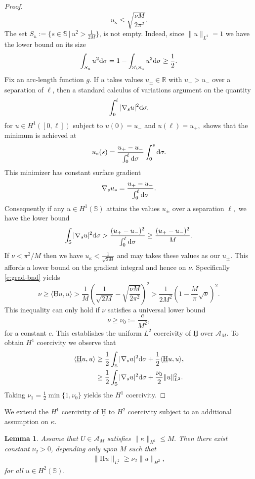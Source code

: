 \documentclass[11pt]{amsart}
\theoremstyle{plain}
\newcommand{\beq}{\begin{equation}}
\newcommand{\eeq}{\end{equation}}
\def\cA{{\mathcal A}}
\def\mbbR{\mathbb{R}}
\def\mbbS{\mathbb{S}}
\def\mrH{\textrm H}
\def\mrd{\textrm d}
\def\mrH{\underline{\mathrm{H}}}
\def\rmd{\mathrm d}
\numberwithin{equation}{section}
\theoremstyle{plain}
\newtheorem{lemma}[thm]{Lemma}
\begin{document}
\begin{proof}
$$ u_\kappa\leq \sqrt{\frac{\nu M}{2\pi^2}}.$$
The set $S_u:=\{s\in\mbbS\,\bigl|\, u^2>\frac{1}{2M}\}$, is not empty. Indeed, since $\|u\|_{L^2}=1$ we have the lower bound on its size 
$$ \int_{S_u} u^2\mrd \sigma=1-\int_{\mbbS\backslash S_u}u^2\rmd \sigma \geq \frac12.$$
Fix an  arc-length function $g$. If $u$ takes values $u_\pm\in\mbbR$ with $u_+>u_-$ over a separation of $\ell$, then a standard calculus of variations argument on the quantity
$$ \int_0^\ell |\nabla_s u|^2\mrd \sigma,$$
for $u\in H^1([0,\ell])$ subject to $u(0)=u_-$ and $u(\ell)=u_+,$ shows that the minimum is achieved at
$$ u_*(s) =\frac{u_+-u_-}{\int_0^\ell\mrd\sigma}\int_0^s\mrd\sigma.$$
This minimizer has constant surface gradient
$$\nabla_s u_* =\frac{u_+-u_-}{\int_0^\ell\mrd\sigma}.$$
Consequently if any $u\in H^1(\mbbS)$ attains the values $u_\pm$ over a separation $\ell,$ we have the lower bound
\beq\label{e:grad-bnd}
\int_\mbbS |\nabla_s u|^2\rmd \sigma >\frac{(u_+-u_-)^2}{\int_0^\ell \mrd\sigma}\geq \frac{(u_+-u_-)^2}{M}.
\eeq
If $\nu< \pi^2/M$ then we have  $u_\kappa<\frac{1}{\sqrt{2M}}$ and may takes these values as our $u_\pm$. This affords a lower bound on the gradient integral and hence on $\nu$. Specifically \eqref{e:grad-bnd} yields
$$ \nu \geq \langle \mrH u, u\rangle > \frac{1}{M} \left(\frac{1}{\sqrt{2M}}-\sqrt{\frac{\nu M}{2\pi^2}}\right)^2> \frac{1}{2M^2}\left(1-\frac{M}{\pi}\sqrt{\nu}\right)^2.$$
This inequality can only hold if $\nu$ satisfies a universal lower bound 
\beq\label{e:nu0-def}\nu\geq\nu_0:= \frac{c}{M^2},
\eeq
for a constant $c.$ This  establishes the uniform $L^2$ coercivity of $\mrH$ over $\cA_M$. To obtain $H^1$ coercivity we observe
that 
$$\begin{aligned}
    \langle \mrH u, u\rangle &\geq \frac 12 \int_\mbbS |\nabla_s u|^2\mrd\sigma+ \frac12\langle\mrH u, u\rangle,\\ 
    &\geq \frac12\int_\mbbS |\nabla_s u|^2\mrd\sigma+   \frac {\nu_0}{2} \|u\|_{L^2}^2.
    \end{aligned} 
 $$
 Taking $\nu_1=\frac12 \min\{1,\nu_0\}$ 
 yields the $H^1$ coercivity.
\end{proof}
We extend the $H^1$ coercivity of $\mrH$ to $H^2$ coercivity subject to an additional assumption on $\kappa.$
\begin{lemma}
\label{l:H2_coerc}
Assume that $U\in\cA_M$ satisfies $\|\kappa\|_{H^1}\leq M.$
Then there exist constant $\nu_2>0$, depending only upon $M$ such that
$$\begin{aligned}
     \|\mrH u \|_{L^2} \geq \nu_2 \|u\|_{H^2},
\end{aligned}$$
for all $u\in H^2(\mbbS).$
\end{lemma}
\end{document}
